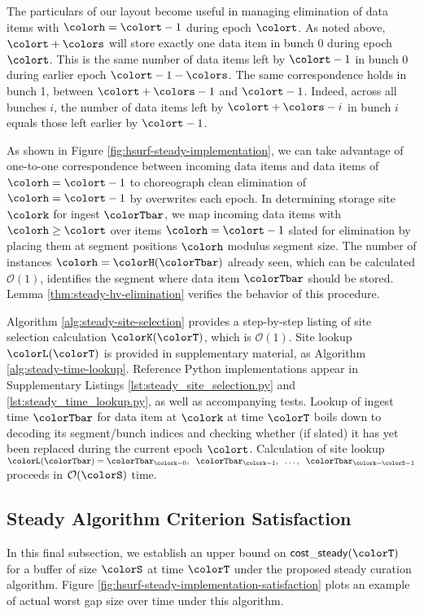 

The particulars of our layout become useful in managing elimination of data items with \hv{} $\colorh = \colort - 1$ during epoch $\colort$.
As noted above, \hv{} $\colort + \colors$ will store exactly one data item in bunch 0 during epoch $\colort$.
This is the same number of data items left by \hv{} $\colort - 1$ in bunch 0 during earlier epoch $\colort - 1 - \colors$.
The same correspondence holds in bunch 1, between \hv{} $\colort + \colors - 1$ and \hv{} $\colort - 1$.
Indeed, across all bunches $i$, the number of data items left by \hv{} $\colort + \colors - i$ in bunch $i$ equals those left earlier by \hv{} $\colort - 1$.

As shown in Figure \ref{fig:hsurf-steady-implementation}, we can take advantage of one-to-one correspondence between incoming data items and data items of \hv{} $\colorh=\colort-1$ to choreograph clean elimination of \hv{} $\colorh=\colort-1$ by overwrites each epoch.
In determining storage site $\colork$ for ingest $\colorTbar$, we map incoming data items with \hv{} $\colorh \geq \colort$ over items $\colorh = \colort - 1$ slated for elimination by placing them at segment positions $\colorh$ modulus segment size.
The number of \hv{} instances $\colorh = \colorH(\colorTbar)$ already seen, which can be calculated $\mathcal{O}(1)$, identifies the segment where data item $\colorTbar$ should be stored.
Lemma \ref{thm:steady-hv-elimination} verifies the behavior of this procedure.



Algorithm \ref{alg:steady-site-selection} provides a step-by-step listing of site selection calculation $\colorK(\colorT)$, which is $\mathcal{O}(1)$.
Site lookup $\colorL(\colorT)$ is provided in supplementary material, as Algorithm \ref{alg:steady-time-lookup}.
Reference Python implementations appear in Supplementary Listings \ref{lst:steady_site_selection.py} and \ref{lst:steady_time_lookup.py}, as well as accompanying tests.
Lookup of ingest time $\colorTbar$ for data item at $\colork$ at time $\colorT$ boils down to decoding its segment/bunch indices and checking whether (if slated) it has yet been replaced during the current epoch $\colort$.
Calculation of site lookup $\colorL(\colorTbar) = \colorTbar_{\colork=0},\;\; \colorTbar_{\colork=1},\;\; \ldots,\;\; \colorTbar_{\colork=\colorS-1}$ proceeds in $\mathcal{O}(\colorS)$ time.

\subsection{Steady Algorithm Criterion Satisfaction}
\label{sec:stready-satisfaction}

In this final subsection, we establish an upper bound on $\mathsf{cost\_steady}(\colorT)$ for a buffer of size $\colorS$ at time $\colorT$ under the proposed steady curation algorithm.
Figure \ref{fig:hsurf-steady-implementation-satisfaction} plots an example of actual worst gap size over time under this algorithm.


